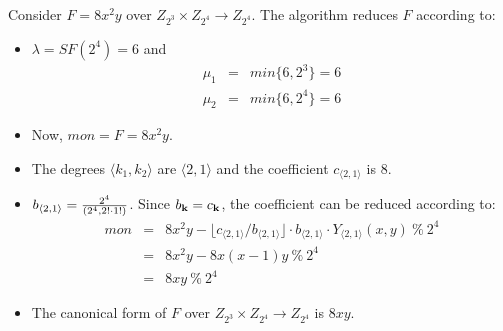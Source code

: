 \begin{Example}
Consider $F = 8x^2y$ over $Z_{2^3} \times Z_{2^4} \rightarrow
Z_{2^4}$. The algorithm reduces $F$ according to:
\begin{itemize}
\item $\lambda = SF(2^4) = 6$  and 
\begin{eqnarray}
\mu_1 &=& min\{6, 2^3\} = 6 \nonumber \\
\mu_2 &=& min\{6, 2^4\} = 6 \nonumber
\end{eqnarray}
\item Now, $mon = F = 8x^2y$.
\item The degrees $\langle k_1, k_2 \rangle$ are $\langle 2, 1
  \rangle$ and the coefficient $c_{\langle  2, 1 \rangle}$ is $8$.
\item $b_{\langle  2, 1 \rangle} = {{2^4}\over{(2^4,2!\cdot
    1!)}}$. Since $b_{\bf k} = c_{\bf k}$, the coefficient can be
    reduced according to:
\begin{eqnarray}
mon &=& 8x^2y - \lfloor{c_{\langle  2, 1 \rangle}/b_{\langle  2, 1 \rangle}}\rfloor \cdot b_{\langle  2, 1
    \rangle}\cdot Y_{\langle  2, 1 \rangle}(x, y)  ~\% ~2^4 \nonumber \\
    &=& 8x^2y - 8x(x-1)y  ~\% ~2^4 \nonumber \\
    &=& 8xy ~\% ~2^4
\end{eqnarray}
\item The canonical form of $F$ over $Z_{2^3} \times Z_{2^4}
  \rightarrow Z_{2^4}$ is $8xy$.
\end{itemize}
\end{Example}
